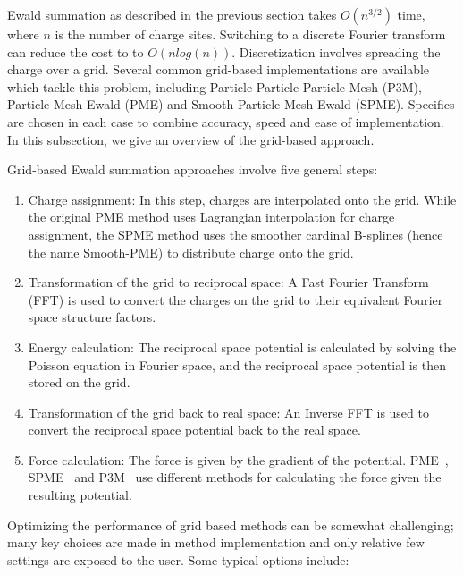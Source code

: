 \documentclass[9pt,bestpractices]{livecoms}
\begin{document}
Ewald summation as described in the previous section takes $O(n^{3/2})$ time, where $n$ is the number of charge sites.
Switching to a discrete Fourier transform can reduce the cost to to $O(n log(n))$.
Discretization involves spreading the charge over a grid.
Several common grid-based implementations are available which tackle this problem, including Particle-Particle Particle Mesh (P3M), Particle Mesh Ewald (PME) and Smooth Particle Mesh Ewald (SPME).
Specifics are chosen in each case to combine accuracy, speed and ease of implementation.
In this subsection, we give an overview of the grid-based approach.

Grid-based Ewald summation approaches involve five general steps:
\begin{enumerate}
\item Charge assignment: In this step, charges are interpolated onto the grid.
While the original PME method uses Lagrangian interpolation for charge assignment, the SPME method uses the smoother cardinal B-splines (hence the name Smooth-PME) to distribute charge onto the grid.

\item Transformation of the grid to reciprocal space: A Fast Fourier Transform (FFT) is used to convert the charges on the grid to their equivalent Fourier space structure factors.

\item Energy calculation: The reciprocal space potential is calculated by solving the Poisson equation in Fourier space, and the reciprocal space potential is then stored on the grid.

\item Transformation of the grid back to real space: An Inverse FFT is used to convert the reciprocal space potential back to the real space.
\item Force calculation: The force is given by the gradient of the potential.
PME~\cite{Darden:1993:JChemPhys}, SPME~\cite{Essman:1995} and P3M~\cite{EASTWOOD1980215} use different methods for calculating the force given the resulting potential.
\end{enumerate}


Optimizing the performance of grid based methods can be somewhat challenging; many key choices are made in method implementation and only relative few settings are exposed to the user.
Some typical options include:
\end{document}
